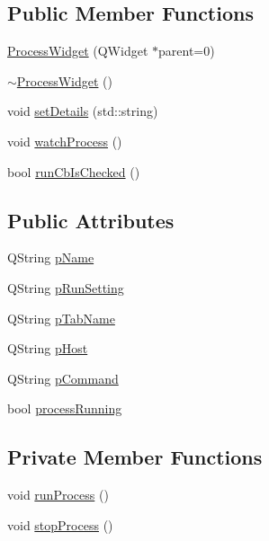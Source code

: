 \subsection*{Public Member Functions}
\begin{DoxyCompactItemize}
\item 
\hyperlink{classProcessWidget_ae3da0e6b25935685f5da927b6b7c05aa}{Process\+Widget} (Q\+Widget $\ast$parent=0)
\item 
\hyperlink{classProcessWidget_a12d26ab48582d37d9209eefe6a04f17a}{$\sim$\+Process\+Widget} ()
\item 
void \hyperlink{classProcessWidget_ac64bea13457eb2e6ea8d96f557023c88}{set\+Details} (std\+::string)
\item 
void \hyperlink{classProcessWidget_a3aebd2c194252ace80ff5874284664f5}{watch\+Process} ()
\item 
bool \hyperlink{classProcessWidget_a4691c640971189f15ee2083b638b1597}{run\+Cb\+Is\+Checked} ()
\end{DoxyCompactItemize}
\subsection*{Public Attributes}
\begin{DoxyCompactItemize}
\item 
Q\+String \hyperlink{classProcessWidget_ae998aedcb05257a11f3f34c975cbb1d8}{p\+Name}
\item 
Q\+String \hyperlink{classProcessWidget_a78ee040355ce578865206d6a2a908510}{p\+Run\+Setting}
\item 
Q\+String \hyperlink{classProcessWidget_a6090de412650269c0d44c12b3ab4e703}{p\+Tab\+Name}
\item 
Q\+String \hyperlink{classProcessWidget_aed23b6c8eb79de37c6a9d5b5702c57b2}{p\+Host}
\item 
Q\+String \hyperlink{classProcessWidget_a02341ab7f2cd0a53bb43f6dc99bd7914}{p\+Command}
\item 
bool \hyperlink{classProcessWidget_a64e6cbfebad2038641bc7eca4455ff0a}{process\+Running}
\end{DoxyCompactItemize}
\subsection*{Private Member Functions}
\begin{DoxyCompactItemize}
\item 
void \hyperlink{classProcessWidget_a4b0910c658e29fce3ed74d531ccbe579}{run\+Process} ()
\item 
void \hyperlink{classProcessWidget_ad9dafd969ab93bde534ce54e3e3ba730}{stop\+Process} ()
\end{DoxyCompactItemize}
